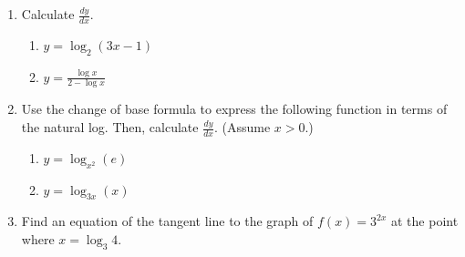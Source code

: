 \documentclass[12pt]{article}
\newif\ifans
\begin{document}
\begin{enumerate}
\newpage

\item Calculate $\frac{dy}{dx}$.

\begin{enumerate}

\item $y = \log_{2}{(3x-1)}$ 

\ifans{\fbox{$\frac{3}{(3x-1)\ln2}$}} \fi

\item $y=\frac{\log{x}}{2-\log{x}}$

\ifans{\fbox{$\frac{2}{x\ln{(10)}(2-\log{x})^2}$}} \fi

\end{enumerate}

\item Use the change of base formula to express the following function in terms of the natural log.  Then, calculate $\frac{dy}{dx}$.  (Assume $x>0$.)

\begin{enumerate}

\item $y=\log_{x^2}{(e)}$

\ifans{\fbox{$y=\frac{1}{2\ln{x}}$; $\frac{dy}{dx}=-\frac{1}{2x(\ln{x})^2}$}} \fi

\item $y = \log_{3x}{(x)}$ 

\ifans{\fbox{$y=\frac{\ln{x}}{\ln{3x}} $; $\frac{dy}{dx}=\frac{\ln{3}}{x(\ln{3x})^2}$}} \fi

\end{enumerate}

\item Find an equation of the tangent line to the graph of $f(x)=3^{2x}$ at the point where $x=\log_3{4}$.

\ifans\fbox{$y-16=32(\ln{3})(x-\log_{3}4)$} \fi

\end{enumerate}
\end{document}
